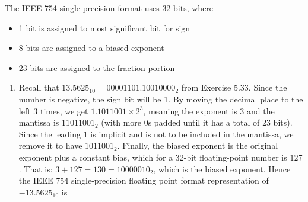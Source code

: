 \documentclass[12pt]{article}
\newenvironment{sol}[1][Solution]{\begin{trivlist}
		\item[\hskip \labelsep {\bfseries #1:}]}{\end{trivlist}}
\begin{document}
\begin{sol}
	The IEEE 754 single-precision format uses 32 bits, where
	\begin{itemize}
		\item 1 bit is assigned to most significant bit for sign
		\item 8 bits are assigned to a biased exponent
		\item 23 bits are assigned to the fraction portion
	\end{itemize}
	\begin{enumerate}[label=(\alph*)]
		\item Recall that $13.5625_{10}=0000 1101.1001 0000 _2$ from Exercise 5.33.
		Since the number is negative, the sign bit will be 1. By moving the decimal
		place to the left 3 times, we get $1.1011001\times 2^{3}$, meaning the
		exponent is $3$ and the mantissa is $1101 1001_2$ (with more 0s padded until
		it has a total of 23 bits). Since the leading 1 is implicit and is not to be
		included in the mantissa, we remove it to have $101 1001_2$. Finally,
		the biased exponent is the original exponent plus a constant bias, which
		for a 32-bit floating-point number is $127$. That is: $3+127=130=1000 0010_2$,
		which is the biased exponent. Hence the IEEE 754 single-precision floating point
		format representation of $-13.5625_{10}$ is


\end{enumerate}
\end{sol}
\end{document}
